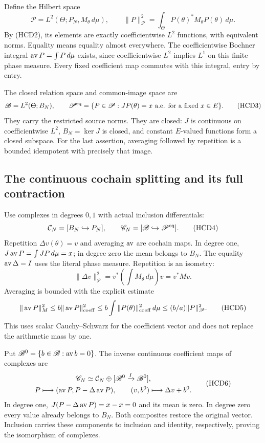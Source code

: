 Define the Hilbert space
\[
 \mathscr P=L^2(\Theta;P_N,M_\theta\,d\mu),\qquad
 \|P\|_{\mathscr P}^2=\int_\Theta P(\theta)^*M_\theta
 P(\theta)\,d\mu.
\]
By (HCD2), its elements are exactly coefficientwise $L^2$
functions, with equivalent norms. Equality means equality
almost everywhere. The coefficientwise Bochner integral
$\operatorname{av} P=\int P\,d\mu$ exists, since coefficientwise $L^2$
implies $L^1$ on this finite phase measure. Every fixed
coefficient map commutes with this integral, entry by entry.

The closed relation space and common-image space are
\[
 \mathscr B=L^2(\Theta;B_N),\qquad
 \mathscr P^{\rm eq}
 =\{P\in\mathscr P:JP(\theta)=x\text{ a.e. for a fixed }x\in E\}.
 \tag{HCD3}
\]
They carry the restricted source norms. They are closed:
$J$ is continuous on coefficientwise $L^2$, $B_N=\ker J$
is closed, and constant $E$-valued functions form a closed
subspace. For the last assertion, averaging followed by
repetition is a bounded idempotent with precisely that image.

\subsection{The continuous cochain splitting and its full contraction}

Use complexes in degrees $0,1$ with actual inclusion differentials:
\[
 \mathcal C_N=[B_N\hookrightarrow P_N],\qquad
 \mathscr C_N=[\mathscr B\hookrightarrow\mathscr P^{\rm eq}].
 \tag{HCD4}
\]
Repetition $\Delta v(\theta)=v$ and averaging $\operatorname{av}$ are cochain
maps. In degree one, $J\operatorname{av} P=\int JP\,d\mu=x$; in degree
zero the mean belongs to $B_N$. The equality $\operatorname{av}\Delta=I$
uses the literal phase measure. Repetition is an isometry:
\[
 \|\Delta v\|_{\mathscr P}^2
 =v^*\left(\int M_\theta\,d\mu\right)v=v^*Mv.
\]
Averaging is bounded with the explicit estimate
\[
 \|\operatorname{av} P\|_M^2
 \le b\|\operatorname{av} P\|_{\rm coeff}^2
 \le b\int\|P(\theta)\|_{\rm coeff}^2\,d\mu
 \le (b/a)\|P\|_{\mathscr P}^2.
 \tag{HCD5}
\]
This uses scalar Cauchy--Schwarz for the coefficient vector
and does not replace the arithmetic mass by one.

Put $\mathscr B^0=\{b\in\mathscr B:\operatorname{av} b=0\}$. The inverse
continuous coefficient maps of complexes are
\[
 \begin{gathered}
 \mathscr C_N\simeq
 \mathcal C_N\oplus[\mathscr B^0\xrightarrow{I}\mathscr B^0],\\
 P\longmapsto(\operatorname{av} P,P-\Delta\operatorname{av} P),\qquad
 (v,b^0)\longmapsto\Delta v+b^0.
 \end{gathered}
 \tag{HCD6}
\]
In degree one, $J(P-\Delta\operatorname{av} P)=x-x=0$ and its mean is
zero. In degree zero every value already belongs to $B_N$.
Both composites restore the original vector. Inclusion
carries these components to inclusion and identity,
respectively, proving the isomorphism of complexes.

